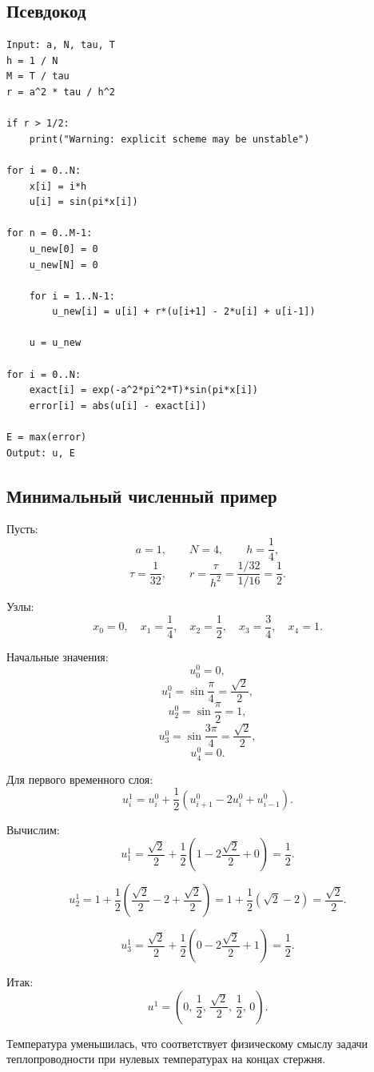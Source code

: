 \documentclass[12pt,a4paper]{article}
\theoremstyle{definition}
\theoremstyle{plain}
\begin{document}
\subsection{Псевдокод}

\begin{lstlisting}[style=pseudo]
Input: a, N, tau, T
h = 1 / N
M = T / tau
r = a^2 * tau / h^2

if r > 1/2:
    print("Warning: explicit scheme may be unstable")

for i = 0..N:
    x[i] = i*h
    u[i] = sin(pi*x[i])

for n = 0..M-1:
    u_new[0] = 0
    u_new[N] = 0

    for i = 1..N-1:
        u_new[i] = u[i] + r*(u[i+1] - 2*u[i] + u[i-1])

    u = u_new

for i = 0..N:
    exact[i] = exp(-a^2*pi^2*T)*sin(pi*x[i])
    error[i] = abs(u[i] - exact[i])

E = max(error)
Output: u, E
\end{lstlisting}

\subsection{Минимальный численный пример}

Пусть:
\[
a=1,\qquad N=4,\qquad h=\frac14,
\]
\[
\tau=\frac{1}{32},\qquad r=\frac{\tau}{h^2}
=
\frac{1/32}{1/16}
=
\frac12.
\]

Узлы:
\[
x_0=0,\quad x_1=\frac14,\quad x_2=\frac12,\quad x_3=\frac34,\quad x_4=1.
\]

Начальные значения:
\[
u_0^0=0,
\]
\[
u_1^0=\sin\frac{\pi}{4}=\frac{\sqrt2}{2},
\]
\[
u_2^0=\sin\frac{\pi}{2}=1,
\]
\[
u_3^0=\sin\frac{3\pi}{4}=\frac{\sqrt2}{2},
\]
\[
u_4^0=0.
\]

Для первого временного слоя:
\[
u_i^{1}
=
u_i^0
+
\frac12(u_{i+1}^0-2u_i^0+u_{i-1}^0).
\]

Вычислим:
\[
u_1^1
=
\frac{\sqrt2}{2}
+
\frac12
\left(
1-2\frac{\sqrt2}{2}+0
\right)
=
\frac12.
\]

\[
u_2^1
=
1+
\frac12
\left(
\frac{\sqrt2}{2}-2+\frac{\sqrt2}{2}
\right)
=
1+\frac12(\sqrt2-2)
=
\frac{\sqrt2}{2}.
\]

\[
u_3^1
=
\frac{\sqrt2}{2}
+
\frac12
\left(
0-2\frac{\sqrt2}{2}+1
\right)
=
\frac12.
\]

Итак:
\[
u^1=
\left(
0,\,
\frac12,\,
\frac{\sqrt2}{2},\,
\frac12,\,
0
\right).
\]

Температура уменьшилась, что соответствует физическому смыслу задачи теплопроводности при нулевых температурах на концах стержня.
\end{document}
